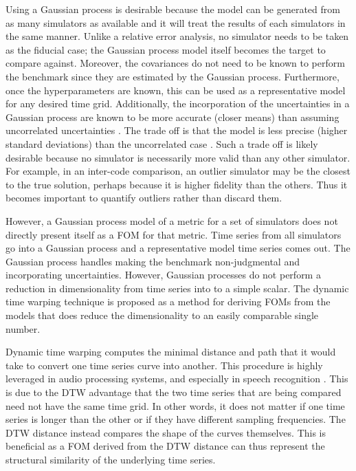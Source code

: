 Using a Gaussian process is desirable because the model can be generated
from as many simulators as available and it will treat the results of
each simulators in the same manner. Unlike a relative error analysis, no 
simulator needs to be taken as the fiducial case; the Gaussian process model 
itself becomes the target to compare against. 
Moreover, the covariances do not need to be known to perform the benchmark
since they are estimated by the Gaussian process. Furthermore, once the 
hyperparameters are known, this can be used as a representative model for 
any desired time grid. Additionally, the incorporation of the uncertainties
in a Gaussian process are known to be more accurate (closer means) than 
assuming uncorrelated uncertainties \cite{rasmussen1996evaluation,ko2009gp}.
The trade off is that the model is less precise (higher standard deviations) 
than the uncorrelated case \cite{hodlr}. Such a trade off is likely 
desirable because no simulator 
is necessarily more valid than any other simulator. For example, 
in an inter-code comparison, an outlier simulator may be the 
closest to the true solution, perhaps because it is higher fidelity than 
the others. Thus it becomes important to quantify outliers rather than 
discard them.

However, a Gaussian process model of a metric for a set of simulators 
does not directly present itself as a FOM for that metric. Time series from 
all simulators go into a Gaussian process and a representative model time 
series comes out. The Gaussian process handles making the benchmark
non-judgmental and incorporating uncertainties. However, Gaussian processes 
do not 
perform a reduction in dimensionality from time series into to a simple 
scalar. The dynamic time warping 
technique is proposed as a method for deriving FOMs from the models that 
does reduce the dimensionality to an easily comparable single number.

Dynamic time warping computes the minimal distance and path that it would 
take to convert one time series curve into another. This procedure is highly 
leveraged in audio processing systems, and especially in speech recognition
\cite{myers1980performance,muda2010voice}.
This is due to the DTW advantage that the two time series that are being 
compared need not have the same time grid. In other words, it does not matter 
if one time series is longer than 
the other or if they have different sampling frequencies. The DTW distance
instead compares the shape of the curves themselves. This is beneficial as
a FOM derived from the DTW distance can thus represent the structural 
similarity of the underlying time series.
 

